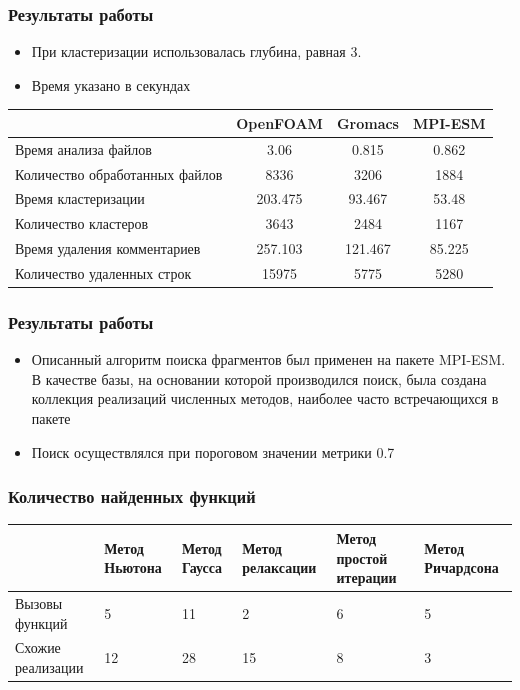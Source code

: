 \documentclass{beamer}
\begin{document}
\begin{frame}
\frametitle{Результаты работы}
\begin{itemize}
	\item При кластеризации использовалась глубина, равная 3.
	\item Время указано в секундах	
\end{itemize}
\begin{small}	
\renewcommand{\arraystretch}{1.2} %
\renewcommand{\tabcolsep}{0.3cm} 
\begin{tabular}{|p{3.8cm}|c|c|c|}
\hline
 & OpenFOAM &  Gromacs & MPI-ESM\\
\hline
Время анализа файлов & 3.06 & 0.815 & 0.862\\
\hline
Количество \newline обработанных файлов & 8336 & 3206 & 1884 \\
\hline
Время кластеризации  & 203.475 & 93.467 & 53.48\\
\hline
Количество кластеров & 3643 & 2484 & 1167\\
\hline
Время \newline удаления комментариев & 257.103 & 121.467 & 85.225\\
\hline
Количество удаленных строк & 15975 & 5775 & 5280\\
\hline
\end{tabular}
\end{small}
\end{frame}

\begin{frame}
\frametitle{Результаты работы}
\begin{itemize}
	\item Описанный алгоритм поиска фрагментов был применен на пакете MPI-ESM. В
качестве базы, на основании которой производился поиск, была создана коллекция реализаций численных методов, наиболее часто встречающихся в пакете
	\item Поиск осуществлялся при пороговом значении метрики 0.7
\end{itemize}
\end{frame}

\begin{frame}
\frametitle{Количество найденных функций}
\begin{small}
\begin{center}
\renewcommand{\arraystretch}{1.8} %
\begin{tabular}{|p{1.6cm}|p{1.4cm}|p{1.0cm}|p{1.3cm}|p{1.5cm}|p{1.9cm}|}
\hline
 & Метод Ньютона &  Метод Гаусса & Метод релаксации & Метод простой итерации & Метод Ричардсона\\
\hline
Вызовы 
\newline функций & 5 & 11 & 2 & 6 & 5 \\
\hline
Схожие 
\newline реализации & 12 & 28 & 15 & 8 & 3\\
\hline
\end{tabular}
\end{center}
\end{small}
\end{frame}
\end{document}
